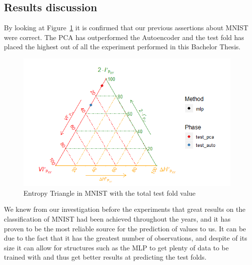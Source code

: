 \subsection{Results discussion} 

By looking at Figure~\ref{fig:figure_Total_MNIST_ET} it is confirmed that our previous assertions about MNIST were correct. The PCA has outperformed the Autoencoder and the test fold has placed the highest out of all the experiment performed in this Bachelor Thesis. \par
%
\begin{figure}[H]
	\centering
	\includegraphics[width=1\linewidth]{Figuras_tfg/MNIST_performance_test}
	\caption{Entropy Triangle in MNIST with the total test fold value}
	\label{fig:figure_Total_MNIST_ET}
\end{figure}


We knew from our investigation before the experiments that great results on the classification of MNIST had been achieved throughout the years, and it has proven to be the most reliable source for the prediction of values to us. It can be due to the fact that it has the greatest number of observations, and despite of its size it can allow for structures such as the MLP to get plenty of data to be trained with and thus get better results at predicting the test folds. \par


